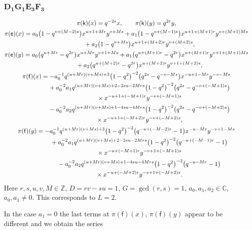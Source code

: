 \documentclass[10pt,a4paper]{amsart}
\numberwithin{equation}{section}
\begin{document}
\subsubsection*{$\boldsymbol{D_1G_1E_3F_3}$}
\begin{gather*}
\pi(\mathsf{k})(x)= q^{-2s}x ,\qquad\pi(\mathsf{k})(y)=q^{2r}y ,\\
\pi(\mathsf{e})(x)= a_0\big(1-q^{v+(M-2)s}\big)x^{u+1+Mr}y^{v+Ms}+ a_1\big(1-q^{v+(M-1)s}\big)x^{u+1+(M+1)r}y^{v+(M+1)Ms}\\
\hphantom{\pi(\mathsf{e})(x)=}{} + a_2\big(1-q^{v+Ms}\big)x^{u+1+(M+2)r}y^{v+(M+2)s} ,\\
\pi(\mathsf{e})(y)= a_0\big(q^{u+Mr}-q^{2r}\big)x^{u+Mr}y^{v+1+Ms}+ a_1\big(q^{u+(M+1)r}-q^{2r}\big)x^{u+(M+1)r}y^{v+1+(M+1)Ms}\\
\hphantom{\pi(\mathsf{e})(y)=}{}+ a_2\big(q^{u+(M+2)r}-q^{2r}\big)x^{u+(M+2)r}y^{v+1+(M+2)s} ,\\
\pi(\mathsf{f})(x)= -a_0^{-1}q^{(u+Mr)(v+Ms)+3}\big(1-q^2\big)^{-2}\big(q^{2s}-q^{-v-Ms}\big)x^{-u+1-Mr}y^{-v-Ms}\\
\hphantom{\pi(\mathsf{f})(x)=}{}+ a_0^{-2}a_1q^{(u+Mr)(v+Ms)+2-2su-2Mrs}\big(1-q^2\big)^{-2}\big(q^{2s}-q^{-v+(-M+1)s}\big)\\
\hphantom{\pi(\mathsf{f})(x)=}{}\times x^{-u+1+(-M+1)r}y^{-v+(-M+1)s}\\
\hphantom{\pi(\mathsf{f})(x)=}{} -a_0^{-2}a_2q^{(u+Mr)(v+Ms)+1-4su-4Mrs}\big(1-q^2\big)^{-2}\big(q^{2s}-q^{-v+(-M+2)s}\big)\\
\hphantom{\pi(\mathsf{f})(x)=}{}\times x^{-u+1+(-M+2)r}y^{-v+(-M+2)s} ,\\
\pi(\mathsf{f})(y)= -a_0^{-1}q^{(u+Mr)(v+Ms)+3}\big(1-q^2\big)^{-2}\big(q^{-u+(-M-2)r}-1\big)x^{-u-Mr}y^{-v+1-Ms}\\
\hphantom{\pi(\mathsf{f})(y)=}{}+ a_0^{-2}a_1q^{(u+Mr)(v+Ms)+2-2su-2Mrs}\big(1-q^2\big)^{-2}\big(q^{-u+(-M-1)r}-1\big)\\
\hphantom{\pi(\mathsf{f})(y)=}{}\times x^{-u+(-M+1)r}y^{-v+1+(-M+1)s}\\
\hphantom{\pi(\mathsf{f})(y)=}{} -a_0^{-2}a_2q^{(u+Mr)(v+Ms)+1-4su-4Mrs}\big(1-q^2\big)^{-2}\big(q^{-u-Mr}-1\big)\\
\hphantom{\pi(\mathsf{f})(y)=}{}\times x^{-u+(-M+2)r}y^{-v+1+(-M+2)s} .
\end{gather*}
Here $r,s,u,v,M\in\mathbb{Z}$, $D=rv-su=1$, $G=\operatorname{gcd}(r,s)=1$, $a_0,a_1,a_2\in\mathbb{C}$, $a_0,a_1\ne 0$. This corresponds to $L=2$.

In the case $a_1=0$ the last terms at $\pi(\mathsf{f})(x)$, $\pi(\mathsf{f})(y)$ appear to be different and we obtain the series
\end{document}
